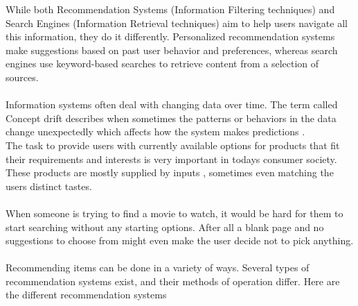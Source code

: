 \documentclass[\myFontSize,a4paper,oneside,english,hidelinks]{article}
\begin{document}
%
While both Recommendation Systems (Information Filtering techniques) and Search Engines (Information Retrieval techniques) aim to help users navigate all this information, they do it differently. Personalized recommendation systems make suggestions based on past user behavior and preferences, whereas search engines use keyword-based searches to retrieve content from a selection of sources.\\\\
%
Information systems often deal with changing data over time. The term called Concept drift describes when sometimes the patterns or behaviors in the data change unexpectedly which affects how the system makes predictions \cite{Sun2024}.\\
The task to provide users with currently available options for products that fit their requirements and interests is very important in todays consumer society. These products are mostly supplied by inputs \cite{Philip2014} , sometimes even matching the users distinct tastes.\\\\
%
When someone is trying to find a movie to watch, it would be hard for them to start searching without any starting options. After all a blank page and no suggestions to choose from might even make the user decide not to pick anything. \\\\
%
\newpage{}
Recommending items can be done in a variety of ways. Several types of recommendation systems exist, and their methods of operation differ. Here are the different recommendation systems\\

%
\end{document}
